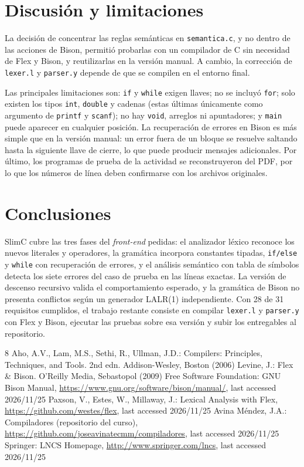 \documentclass[runningheads]{llncs}
\begin{document}
\section{Discusión y limitaciones}
La decisión de concentrar las reglas semánticas en \texttt{semantica.c}, y no dentro de las acciones de Bison, permitió probarlas con un compilador de C sin necesidad de Flex y Bison, y reutilizarlas en la versión manual. A cambio, la corrección de \texttt{lexer.l} y \texttt{parser.y} depende de que se compilen en el entorno final.

Las principales limitaciones son: \texttt{if} y \texttt{while} exigen llaves; no se incluyó \texttt{for}; solo existen los tipos \texttt{int}, \texttt{double} y cadenas (estas últimas únicamente como argumento de \texttt{printf} y \texttt{scanf}); no hay \texttt{void}, arreglos ni apuntadores; y \texttt{main} puede aparecer en cualquier posición. La recuperación de errores en Bison es más simple que en la versión manual: un error fuera de un bloque se resuelve saltando hasta la siguiente llave de cierre, lo que puede producir mensajes adicionales. Por último, los programas de prueba de la actividad se reconstruyeron del PDF, por lo que los números de línea deben confirmarse con los archivos originales.

\section{Conclusiones}
SlimC cubre las tres fases del \emph{front-end} pedidas: el analizador léxico reconoce los nuevos literales y operadores, la gramática incorpora constantes tipadas, \texttt{if/else} y \texttt{while} con recuperación de errores, y el análisis semántico con tabla de símbolos detecta los siete errores del caso de prueba en las líneas exactas. La versión de descenso recursivo valida el comportamiento esperado, y la gramática de Bison no presenta conflictos según un generador LALR(1) independiente. Con 28 de 31 requisitos cumplidos, el trabajo restante consiste en compilar \texttt{lexer.l} y \texttt{parser.y} con Flex y Bison, ejecutar las pruebas sobre esa versión y subir los entregables al repositorio.

\begin{thebibliography}{8}
 Aho, A.V., Lam, M.S., Sethi, R., Ullman, J.D.: Compilers: Principles, Techniques, and Tools. 2nd edn. Addison-Wesley, Boston (2006)
 Levine, J.: Flex \& Bison. O'Reilly Media, Sebastopol (2009)
 Free Software Foundation: GNU Bison Manual, \url{https://www.gnu.org/software/bison/manual/}, last accessed 2026/11/25
 Paxson, V., Estes, W., Millaway, J.: Lexical Analysis with Flex, \url{https://github.com/westes/flex}, last accessed 2026/11/25
 Avina Méndez, J.A.: Compiladores (repositorio del curso), \url{https://github.com/joseavinatecmm/compiladores}, last accessed 2026/11/25
 Springer: LNCS Homepage, \url{http://www.springer.com/lncs}, last accessed 2026/11/25
\end{thebibliography}
\end{document}
